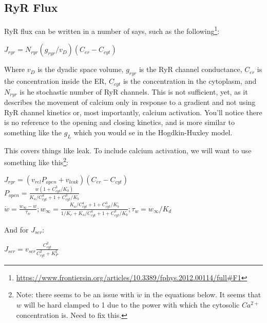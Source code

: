 \documentclass[12pt]{amsart}
\begin{document}
\subsection{RyR Flux} RyR flux can be written in a number of says, such as the following\footnote{\url{https://www.frontiersin.org/articles/10.3389/fphys.2012.00114/full\#F1}}: 

\bigskip

\begin{center}

    $J_{ryr} = N_{ryr}(g_{ryr}/v_D)(C_{er} - C_{cyt})$
    
\end{center}

\bigskip

Where $v_D$ is the dyadic space volume, $g_{ryr}$ is the RyR channel conductance, $C_{er}$ is the concentration inside the ER, $C_{cyt}$ is the concentration in the cytoplasm, and $N_{ryr}$ is he stochastic number of RyR channels. This is not sufficient, yet, as it describes the movement of calcium only in response to a gradient and not using RyR channel kinetics or, most importantly, calcium activation. You'll notice there is no reference to the opening and closing kinetics, and is more similar to something like the $g_L$ which you would se in the Hogdkin-Huxley model.\newline

This covers things like leak. To include calcium activation, we will want to use something like this\footnote{Note: there seems to be an issue with $\dot{w}$ in the equations below. It seems that $w$ will be hard clamped to 1 due to the power with which the cytosolic $Ca^{2+}$ concentration is. Need to fix this.}: 

\bigskip
\begin{center}

    $J_{ryr} = (v_{rel}P_{open} + v_{leak})(C_{er} - C_{cyt})$\\
    \smallskip
    $P_{open} = \frac{w(1 + C^3_{cyt} / K_b)}{K_a / C^4_{cyt} + 1 + C_{cyt}^3/ K_b}$\\
    \smallskip
    $\dot{w} = \frac{w_{\infty} - w}{\tau_w}; w_{\infty} = \frac{K_a / C^4_{cyt} + 1 + C_{cyt}^3/ K_b}{1/K_c + K_a / C^4_{cyt} + 1 + C_{cyt}^3/ K_b}; \tau_w = w_{\infty}/K_d$
    
\end{center}

And for $J_{ser}$:

\begin{center}

    $J_{ser} = v_{ser}\frac{C^2_{cyt}}{C^2_{cyt} + K^2_P}$\\
    
\end{center}
\end{document}
